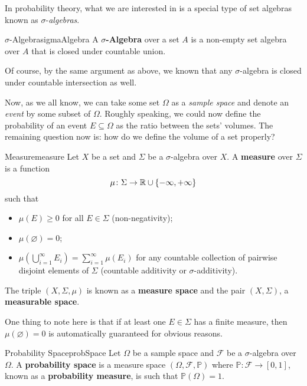 \documentclass[math, code]{amznotes}
\theoremstyle{remark}
\begin{document}
In probability theory, what we are interested in is a special type of set algebras known as $\sigma$-\textit{algebras}.
\begin{dfnbox}{$\sigma$-Algebra}{sigmaAlgebra}
    A {\color{red} \textbf{$\sigma$-Algebra}} over a set $A$ is a non-empty set algebra over $A$ that is closed under countable union.
\end{dfnbox}
Of course, by the same argument as above, we known that any $\sigma$-algebra is closed under countable intersection as well.

Now, as we all know, we can take some set $\Omega$ as a \textit{sample space} and denote an \textit{event} by some subset of $\Omega$. Roughly speaking, we could now define the probability of an event $E \subseteq \Omega$ as the ratio between the sets' volumes. The remaining question now is: how do we define the volume of a set properly?
\begin{dfnbox}{Measure}{measure}
    Let $X$ be a set and $\Sigma$ be a $\sigma$-algebra over $X$. A {\color{red} \textbf{measure}} over $\Sigma$ is a function 
    \begin{equation*}
        \mu \colon \Sigma \to \mathbb{R} \cup \{-\infty, +\infty\}
    \end{equation*}
    such that 
    \begin{itemize}
        \item $\mu\left(E\right) \geq 0$ for all $E \in \Sigma$ (non-negativity);
        \item $\mu\left(\varnothing\right) = 0$;
        \item $\mu\left(\bigcup_{i = 1}^{\infty}E_i\right) = \sum_{i = 1}^{\infty}\mu\left(E_i\right)$ for any countable collection of pairwise disjoint elements of $\Sigma$ (countable additivity or $\sigma$-additivity).
    \end{itemize}
    The triple $\left(X, \Sigma, \mu\right)$ is known as a {\color{red} \textbf{measure space}} and the pair $\left(X, \Sigma\right)$, a {\color{red} \textbf{measurable space}}.
\end{dfnbox}
One thing to note here is that if at least one $E \in \Sigma$ has a finite measure, then $\mu\left(\varnothing\right) = 0$ is automatically guaranteed for obvious reasons.
\begin{dfnbox}{Probability Space}{probSpace}
    Let $\Omega$ be a sample space and $\mathcal{F}$ be a $\sigma$-algebra over $\Omega$. A {\color{red} \textbf{probability space}} is a measure space $\left(\Omega, \mathcal{F}, \mathbb{P}\right)$ where $\mathbb{P} \colon \mathcal{F} \to [0, 1]$, known as a {\color{red} \textbf{probability measure}}, is such that $\mathbb{P}\left(\Omega\right) = 1$.
\end{dfnbox}
\end{document}
